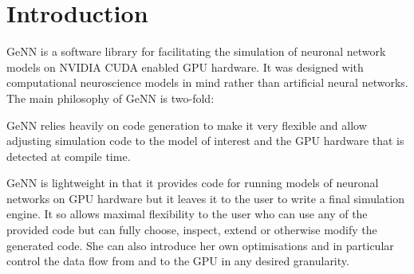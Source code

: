 \hypertarget{Manual_sIntro}{}\section{Introduction}\label{Manual_sIntro}
Ge\+N\+N is a software library for facilitating the simulation of neuronal network models on N\+V\+I\+D\+I\+A C\+U\+D\+A enabled G\+P\+U hardware. It was designed with computational neuroscience models in mind rather than artificial neural networks. The main philosophy of Ge\+N\+N is two-\/fold\+:
\begin{DoxyItemize}
\item Ge\+N\+N relies heavily on code generation to make it very flexible and allow adjusting simulation code to the model of interest and the G\+P\+U hardware that is detected at compile time.
\item Ge\+N\+N is lightweight in that it provides code for running models of neuronal networks on G\+P\+U hardware but it leaves it to the user to write a final simulation engine. It so allows maximal flexibility to the user who can use any of the provided code but can fully choose, inspect, extend or otherwise modify the generated code. She can also introduce her own optimisations and in particular control the data flow from and to the G\+P\+U in any desired granularity.
\end{DoxyItemize}

